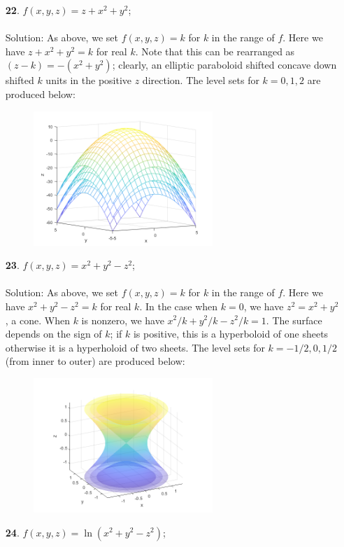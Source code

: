 \documentclass[12pt]{amsbook}
\begin{document}
\begin{enumerate}
\begin{center}
  \end{center}
  \item[{\small\bf 22}.] $f(x,y,z)=z+x^2+y^2$;
  \\
  \\
  {\sc Solution}: As above, we set $f(x,y,z)=k$ for $k$ in the range of $f$. Here we have $z+x^2+y^2=k$ for real $k$. Note that this can be rearranged as $(z-k)=-(x^2+y^2)$; clearly, an elliptic paraboloid shifted concave down shifted $k$ units in the positive $z$ direction. The level sets for $k=0,1,2$ are produced below:
  \begin{center}
  \includegraphics[width=3.5in,height=2.0in]{3_1_22.png}
  \end{center}
  \item[{\small\bf 23}.] $f(x,y,z)=x^2+y^2-z^2$;
  \\
  \\
  {\sc Solution}: As above, we set $f(x,y,z)=k$ for $k$ in the range of $f$. Here we have $x^2+y^2-z^2=k$ for real $k$. In the case when $k=0$, we have $z^2=x^2+y^2$, a cone. When $k$ is nonzero, we have $x^2/k+y^2/k-z^2/k=1$. The surface depends on the sign of $k$; if $k$ is positive, this is a hyperboloid of one sheets otherwise it is a hyperholoid of two sheets. The level sets for $k=-1/2,0,1/2$ (from inner to outer) are produced below:
  \begin{center}
  \includegraphics[width=3.5in,height=2.0in]{3_1_23.png}
  \end{center}
  \item[{\small\bf 24}.] $f(x,y,z)=\ln(x^2+y^2-z^2)$;

\end{enumerate}
\end{document}
